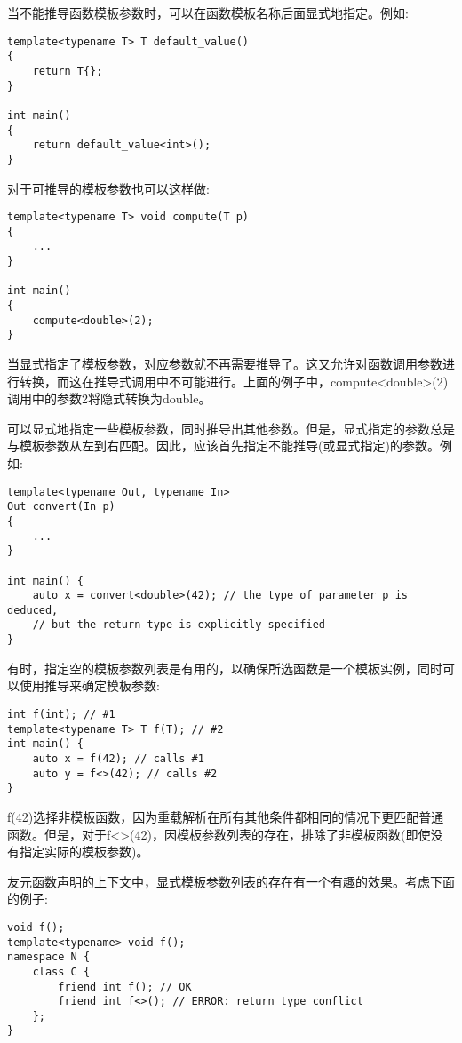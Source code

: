 当不能推导函数模板参数时，可以在函数模板名称后面显式地指定。例如:

\begin{lstlisting}[style=styleCXX]
template<typename T> T default_value()
{
	return T{};
}

int main()
{
	return default_value<int>();
}
\end{lstlisting}

对于可推导的模板参数也可以这样做:

\begin{lstlisting}[style=styleCXX]
template<typename T> void compute(T p)
{
	...
}

int main()
{
	compute<double>(2);
}
\end{lstlisting}

当显式指定了模板参数，对应参数就不再需要推导了。这又允许对函数调用参数进行转换，而这在推导式调用中不可能进行。上面的例子中，compute<double>(2)调用中的参数2将隐式转换为double。

可以显式地指定一些模板参数，同时推导出其他参数。但是，显式指定的参数总是与模板参数从左到右匹配。因此，应该首先指定不能推导(或显式指定)的参数。例如:

\begin{lstlisting}[style=styleCXX]
template<typename Out, typename In>
Out convert(In p)
{
	...
}

int main() {
	auto x = convert<double>(42); // the type of parameter p is deduced,
	// but the return type is explicitly specified
}
\end{lstlisting}

有时，指定空的模板参数列表是有用的，以确保所选函数是一个模板实例，同时可以使用推导来确定模板参数:

\begin{lstlisting}[style=styleCXX]
int f(int); // #1
template<typename T> T f(T); // #2
int main() {
	auto x = f(42); // calls #1
	auto y = f<>(42); // calls #2
}
\end{lstlisting}

f(42)选择非模板函数，因为重载解析在所有其他条件都相同的情况下更匹配普通函数。但是，对于f<>(42)，因模板参数列表的存在，排除了非模板函数(即使没有指定实际的模板参数)。

友元函数声明的上下文中，显式模板参数列表的存在有一个有趣的效果。考虑下面的例子:

\begin{lstlisting}[style=styleCXX]
void f();
template<typename> void f();
namespace N {
	class C {
		friend int f(); // OK
		friend int f<>(); // ERROR: return type conflict
	};
}
\end{lstlisting}

